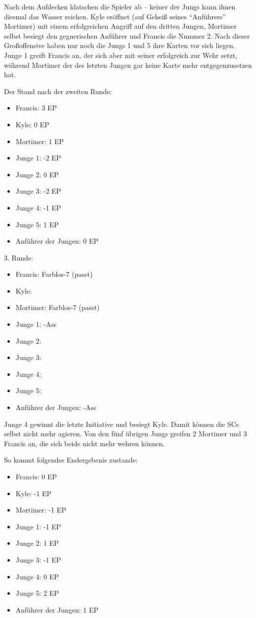 Nach dem Aufdecken klatschen die Spieler ab -- keiner der Jungs kann ihnen diesmal das Wasser reichen. Kyle eröffnet (auf Geheiß seines "`Anführers"' Mortimer) mit einem erfolgreichen Angriff auf den dritten Jungen, Mortimer selbst besiegt den gegnerischen Anführer und Francis die Nummer 2. Nach dieser Großoffensive haben nur noch die Jungs 1 und 5 ihre Karten vor sich liegen. Junge 1 greift Francis an, der sich aber mit seiner  erfolgreich zur Wehr setzt, während Mortimer der  des letzten Jungen gar keine Karte mehr entgegenzusetzen hat.

Der Stand nach der zweiten Runde:
\begin {itemize}
\item Francis: 3 EP
\item Kyle: 0 EP
\item Mortimer: 1 EP
\item Junge 1: -2 EP
\item Junge 2: 0 EP
\item Junge 3: -2 EP
\item Junge 4: -1 EP
\item Junge 5: 1 EP
\item Anführer der Jungen: 0 EP
\end {itemize}

3. Runde:
\begin {itemize}
\item Francis: Farblos-7 (passt)
\item Kyle: 
\item Mortimer: Farblos-7 (passt)
\item Junge 1: \herz-Ass
\item Junge 2: 
\item Junge 3: 
\item Junge 4: 
\item Junge 5: 
\item Anführer der Jungen: \herz-Ass
\end {itemize}

Junge 4 gewinnt die letzte Initiative und besiegt Kyle. Damit können die SCs selbst nicht mehr agieren. Von den fünf übrigen Jungs greifen 2 Mortimer und 3 Francis an, die sich beide nicht mehr wehren können.

So kommt folgendes Endergebenis zustande:
\begin {itemize}
\item Francis: 0 EP
\item Kyle: -1 EP
\item Mortimer: -1 EP
\item Junge 1: -1 EP
\item Junge 2: 1 EP
\item Junge 3: -1 EP
\item Junge 4: 0 EP
\item Junge 5: 2 EP
\item Anführer der Jungen: 1 EP
\end {itemize}

